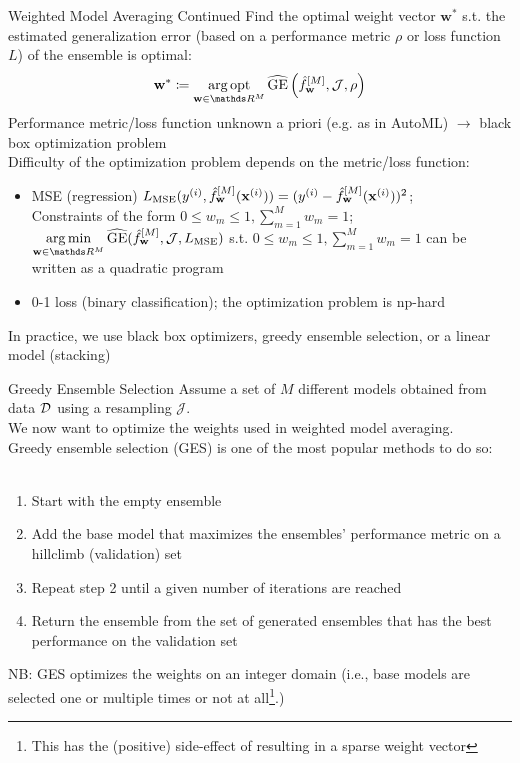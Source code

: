 \documentclass[11pt,compress,t,notes=noshow, aspectratio=169, xcolor=table]{beamer}
\begin{document}
\begin{vbframe}{Weighted Model Averaging Continued}
Find the optimal weight vector $\mathbf{w}^{*}$ s.t. the estimated generalization error (based on a performance metric $\rho$ or loss function $L$) of the ensemble is optimal:\\
$$\wstar \coloneqq \argoptlim_{\w \in \R^{M}} \GEh\left(\fMw, \mathcal{J}, \rho\right)$$
\vspace{1em}
Performance metric/loss function unknown a priori (e.g. as in AutoML) $\rightarrow$ black box optimization problem\\
\vspace{1em}
Difficulty of the optimization problem depends on the metric/loss function:
\begin{itemize}
    \item MSE (regression) $L_{\mathrm{MSE}}(y^{(i)}, \hat{f}_{\mathbf{w}}^{[M]}(\mathbf{x}^{(i)})) = (y^{(i)} - \hat{f}_{\mathbf{w}}^{[M]}(\mathbf{x}^{(i)}))^{2}$;\\
          Constraints of the form $0 \le w_{m} \le 1, \sum_{m=1}^{M} w_{m} = 1$;\\
        $\argminlim_{\w \in \R^{M}} \GEh(\fMw, \mathcal{J}, L_{\mathrm{MSE}})$ s.t. $0 \le w_{m} \le 1, \sum_{m=1}^{M} w_{m} = 1$ can be written as a quadratic program
    \item 0-1 loss (binary classification); the optimization problem is np-hard
\end{itemize}
\vspace{1em}
In practice, we use black box optimizers, greedy ensemble selection, or a linear model (stacking)
\end{vbframe}


\begin{vbframe}{Greedy Ensemble Selection}
Assume a set of $M$ different models obtained from data $\mathcal{D}$ using a resampling $\mathcal{J}$.\\
We now want to optimize the weights used in weighted model averaging.\\
\vspace{1em}
Greedy ensemble selection (GES) is one of the most popular methods to do so:\\\
\begin{enumerate}
    \item Start with the empty ensemble
    \item Add the base model that maximizes the ensembles' performance metric on a hillclimb (validation) set
    \item Repeat step 2 until a given number of iterations are reached
    \item Return the ensemble from the set of generated ensembles that has the best performance on the validation set
\end{enumerate}
\vspace{1em}
NB: GES optimizes the weights on an integer domain (i.e., base models are selected one or multiple times or not at all\footnote{This has the (positive) side-effect of resulting in a sparse weight vector}.)
\end{vbframe}
\end{document}
